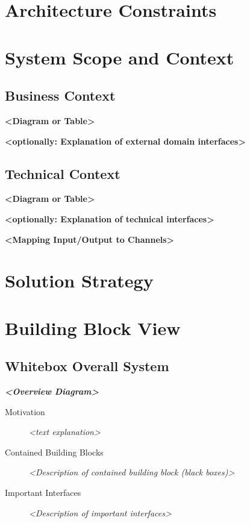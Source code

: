 \documentclass[]{article}
\begin{document}
\section{Architecture
Constraints}\label{section-architecture-constraints}

\section{System Scope and
Context}\label{section-system-scope-and-context}

\subsection{Business Context}\label{_business_context}

\textbf{\textless{}Diagram or Table\textgreater{}}

\textbf{\textless{}optionally: Explanation of external domain
interfaces\textgreater{}}

\subsection{Technical Context}\label{_technical_context}

\textbf{\textless{}Diagram or Table\textgreater{}}

\textbf{\textless{}optionally: Explanation of technical
interfaces\textgreater{}}

\textbf{\textless{}Mapping Input/Output to Channels\textgreater{}}

\section{Solution Strategy}\label{section-solution-strategy}

\section{Building Block View}\label{section-building-block-view}

\subsection{Whitebox Overall System}\label{_whitebox_overall_system}

\emph{\textbf{\textless{}Overview Diagram\textgreater{}}}

\begin{description}
\item[Motivation]
\emph{\textless{}text explanation\textgreater{}}
\item[Contained Building Blocks]
\emph{\textless{}Description of contained building block (black
boxes)\textgreater{}}
\item[Important Interfaces]
\emph{\textless{}Description of important interfaces\textgreater{}}
\end{description}
\end{document}
